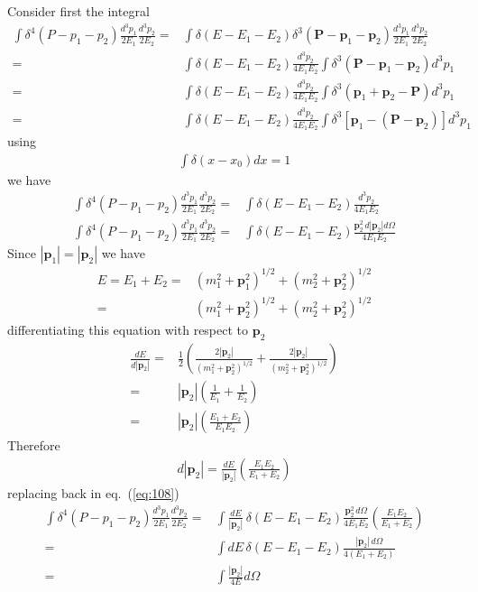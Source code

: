 Consider first the integral
\begin{align}
  \int \delta^4(P-p_1-p_2)
\frac{d^3 p_1}{2E_1}\frac{d^3 p_2}{2E_2}=&\int\delta(E-E_1-E_2)
\delta^3(\mathbf{P}-\mathbf{p}_1-\mathbf{p}_2)\frac{d^3 p_1}{2E_1}\frac{d^3 p_2}{2E_2}\nonumber\\
  =&\int\delta(E-E_1-E_2)
\frac{d^3 p_2}{4E_1 E_2}\int\delta^3(\mathbf{P}-\mathbf{p}_1-\mathbf{p}_2){d^3 p_1}\nonumber\\
  =&\int\delta(E-E_1-E_2)
\frac{d^3 p_2}{4E_1 E_2}\int\delta^3(\mathbf{p}_1+\mathbf{p}_2-\mathbf{P}){d^3 p_1}\nonumber\\
  =&\int\delta(E-E_1-E_2)
\frac{d^3 p_2}{4E_1 E_2}\int\delta^3[\mathbf{p}_1-(\mathbf{P}-\mathbf{p}_2)]{d^3 p_1}
\end{align}
using
\begin{align}
  \int\delta(x-x_0)dx=1
\end{align}
we have
\begin{align}
  \label{eq:108}
    \int \delta^4(P-p_1-p_2)
\frac{d^3 p_1}{2E_1}\frac{d^3 p_2}{2E_2}=&
\int\delta(E-E_1-E_2)\frac{d^3 p_2}{4E_1 E_2}\nonumber\\
    \int \delta^4(P-p_1-p_2)
\frac{d^3 p_1}{2E_1}\frac{d^3 p_2}{2E_2}=&
\int\delta(E-E_1-E_2)\frac{\mathbf{p}_2^2\,d|\mathbf{p}_2|d\Omega}{4E_1 E_2}
\end{align}
Since $|\mathbf{p}_1|=|\mathbf{p}_2|$ we have
\begin{align}
  E=E_1+E_2=&(m_1^2+\mathbf{p}_1^2)^{1/2}+(m_2^2+\mathbf{p}_2^2)^{1/2}\nonumber\\
  =&(m_1^2+\mathbf{p}_2^2)^{1/2}+(m_2^2+\mathbf{p}_2^2)^{1/2}
\end{align}
differentiating this equation with respect to $\mathbf{p}_2$
\begin{align}
  \frac{d E}{d|\mathbf{p}_2|}=&\frac{1}{2}\left(
\frac{2|\mathbf{p}_2|}{(m_1^2+\mathbf{p}_2^2)^{1/2}}+
\frac{2|\mathbf{p}_2|}{(m_2^2+\mathbf{p}_2^2)^{1/2}}\right)\nonumber\\
=&|\mathbf{p}_2|\left(\frac{1}{E_1}+\frac{1}{E_2}\right)\nonumber\\
  =&|\mathbf{p}_2|\left(\frac{E_1+E_2}{E_1 E_2}\right)
\end{align} 
Therefore
\begin{align}
  d|\mathbf{p}_2|=\frac{d E}{|\mathbf{p}_2|}\left(\frac{E_1 E_2}{E_1+E_2}\right)
\end{align}
replacing back in eq.~(\ref{eq:108})
\begin{align}
      \int \delta^4(P-p_1-p_2)\frac{d^3 p_1}{2E_1}\frac{d^3 p_2}{2E_2}
      =&\int\frac{d E}{|\mathbf{p}_2|}\,\delta(E-E_1-E_2)\frac{\mathbf{p}_2^2\,d\Omega}{4E_1 E_2}
      \left(\frac{E_1 E_2}{E_1+E_2}\right)\nonumber\\
      =&\int d E\,\delta(E-E_1-E_2)\frac{|\mathbf{p}_2|\,d\Omega}{4(E_1+E_2)}\nonumber\\
      =&  \int\frac{|\mathbf{p}_2|}{4 E}d\Omega
\end{align}
